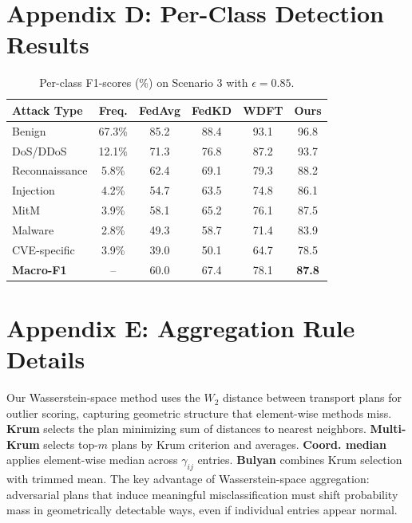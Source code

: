 \documentclass[11pt]{article}
\theoremstyle{plain}
\theoremstyle{definition}
\theoremstyle{remark}
\begin{document}
\section*{Appendix D: Per-Class Detection Results}
\begin{table}[!h]
\renewcommand{\arraystretch}{1.15}
\caption{Per-class F1-scores (\%) on Scenario 3 with $\epsilon = 0.85$.}
\centering\small
\begin{tabular}{lccccc}
\hline
\textbf{Attack Type} & \textbf{Freq.} & \textbf{FedAvg} & \textbf{FedKD} & \textbf{WDFT} & \textbf{Ours} \\
\hline
Benign & 67.3\% & 85.2 & 88.4 & 93.1 & 96.8 \\
DoS/DDoS & 12.1\% & 71.3 & 76.8 & 87.2 & 93.7 \\
Reconnaissance & 5.8\% & 62.4 & 69.1 & 79.3 & 88.2 \\
Injection & 4.2\% & 54.7 & 63.5 & 74.8 & 86.1 \\
MitM & 3.9\% & 58.1 & 65.2 & 76.1 & 87.5 \\
Malware & 2.8\% & 49.3 & 58.7 & 71.4 & 83.9 \\
CVE-specific & 3.9\% & 39.0 & 50.1 & 64.7 & 78.5 \\
\hline
\textbf{Macro-F1} & -- & 60.0 & 67.4 & 78.1 & \textbf{87.8} \\
\hline
\end{tabular}
\end{table}

\section*{Appendix E: Aggregation Rule Details}
Our Wasserstein-space method uses the $W_2$ distance between transport plans for outlier scoring, capturing geometric structure that element-wise methods miss. \textbf{Krum} selects the plan minimizing sum of distances to nearest neighbors. \textbf{Multi-Krum} selects top-$m$ plans by Krum criterion and averages. \textbf{Coord. median} applies element-wise median across $\gamma_{ij}$ entries. \textbf{Bulyan} combines Krum selection with trimmed mean. The key advantage of Wasserstein-space aggregation: adversarial plans that induce meaningful misclassification must shift probability mass in geometrically detectable ways, even if individual entries appear normal.
\end{document}
